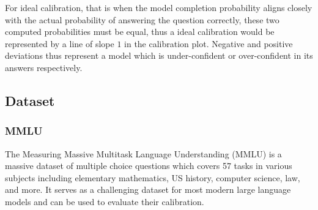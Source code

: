 \documentclass[11pt]{article}
\begin{document}
For ideal calibration, that is when the model completion probability aligns
closely with the actual probability of answering the question correctly, these 
two computed probabilities must be equal, thus a ideal calibration would be 
represented  by a line of slope $1$ in the calibration plot. Negative 
and positive deviations thus represent a model which is under-confident 
or over-confident  in its answers respectively.

\subsection{Dataset}

\subsubsection{MMLU}

The Measuring Massive Multitask Language Understanding (MMLU) 
\cite{hendrycks2021measuring} is a massive dataset of multiple choice 
questions which covers 57 tasks in various subjects including 
elementary mathematics, US history, computer science, law, and more. It 
serves as a challenging dataset for most modern large language models and can be used to evaluate their calibration.
\end{document}
